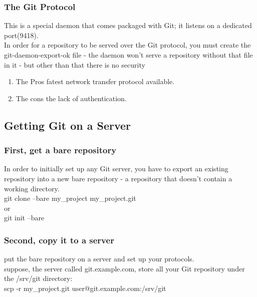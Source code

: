 \documentclass[11pt]{article}
\begin{document}
\subsubsection{The Git Protocol}
\label{sec:org3772057}
This is a special daemon that comes packaged with Git; it listens on a dedicated port(9418).\\
In order for a repository to be served over the Git protocol, you must create the git-daemon-export-ok file - the daemon won't serve a repository without that file in it - but other than that there is no security\\

\begin{enumerate}
\item The Pros
\label{sec:org6e6572e}
fatest network transfer protocol available.\\

\item The cons
\label{sec:org7ef0ea4}
the lack of authentication.\\
\end{enumerate}

\subsection{Getting Git on a Server}
\label{sec:org612c15b}
\subsubsection{First, get a bare repository}
\label{sec:org5387e61}
In order to initially set up any Git server, you have to export an existing repository into a new bare repository - a repository that doesn't contain a working directory.\\
git clone --bare my\_project my\_project.git\\
or\\
git init --bare\\

\subsubsection{Second, copy it to a server}
\label{sec:orga28a0bc}
put the bare repository on a server and set up your protocols.\\

suppose, the server called git.example.com, store all your Git repository under the /srv/git directory:\\
scp -r my\_project.git user@git.example.com:/srv/git\\
\end{document}
